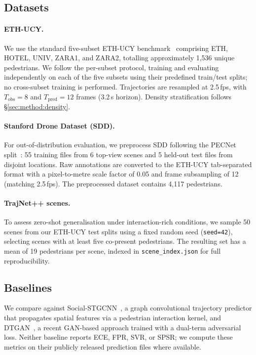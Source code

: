 \subsection{Datasets}
\label{sec:exp:datasets}

\paragraph{ETH-UCY.}
We use the standard five-subset ETH-UCY
benchmark~\cite{pellegrini2009eth,lerner2007ucy} comprising ETH, HOTEL, UNIV,
ZARA1, and ZARA2, totalling approximately 1,536 unique pedestrians. We follow
the per-subset protocol, training and evaluating independently on each of the
five subsets using their predefined train/test splits; no cross-subset training
is performed. Trajectories are resampled at 2.5\,fps, with
\(T_{\text{obs}} = 8\) and \(T_{\text{pred}} = 12\) frames (3.2\,s horizon).
Density stratification follows \S\ref{sec:method:density}.

\paragraph{Stanford Drone Dataset (SDD).}
For out-of-distribution evaluation, we preprocess SDD following the PECNet
split~\cite{mangalam2020pecnet}: 55 training files from 6 top-view scenes and
5 held-out test files from disjoint locations. Raw annotations are converted to
the ETH-UCY tab-separated format with a pixel-to-metre scale factor of 0.05
and frame subsampling of 12 (matching 2.5\,fps). The preprocessed dataset
contains 4,117 pedestrians.

\paragraph{TrajNet++ scenes.}
To assess zero-shot generalisation under interaction-rich conditions, we sample
50 scenes from our ETH-UCY test splits using a fixed random seed (\texttt{seed=42}),
selecting scenes with at least five co-present pedestrians. The resulting set
has a mean of 19 pedestrians per scene, indexed in
\texttt{scene\_index.json} for full reproducibility.

\subsection{Baselines}
\label{sec:exp:baselines}

We compare against Social-STGCNN~\cite{mohamed2020social}, a graph convolutional
trajectory predictor that propagates spatial features via a pedestrian
interaction kernel, and DTGAN~\cite{mao2025dtgan}, a recent GAN-based approach
trained with a dual-term adversarial loss. Neither baseline reports ECE, FPR,
SVR, or SPSR; we compute these metrics on their publicly released prediction
files where available.

